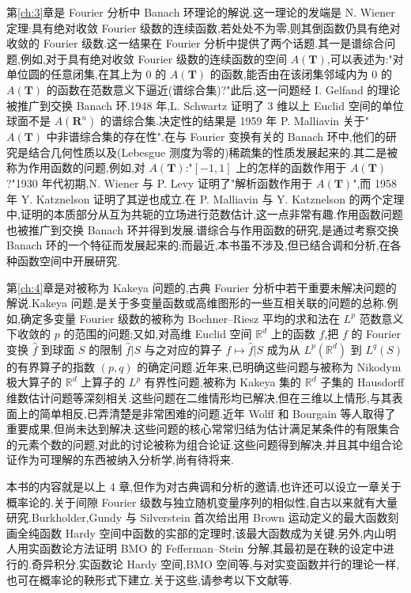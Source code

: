 第\ref{ch:3}章是 Fourier 分析中 Banach 环理论的解说.这一理论的发端是 N. Wiener 定理:具有绝对收敛 Fourier 级数的连续函数,若处处不为零,则其倒函数仍具有绝对收敛的 Fourier 级数.这一结果在 Fourier 分析中提供了两个话题.其一是谱综合问题,例如,对于具有绝对收敛 Fourier 级数的连续函数的空间 $A(\mathbf{T})$,可以表述为:"对单位圆的任意闭集,在其上为 0 的 $A(\mathbf{T})$ 的函数,能否由在该闭集邻域内为 0 的 $A(\mathbf{T})$ 的函数在范数意义下逼近(谱综合集)?"此后,这一问题经 I. Gelfand 的理论被推广到交换 Banach 环.1948 年,L. Schwartz 证明了 3 维以上 Euclid 空间的单位球面不是 $A(\mathbf{R}^{n})$ 的谱综合集.决定性的结果是 1959 年 P. Malliavin 关于"$A(\mathbf{T})$ 中非谱综合集的存在性".在与 Fourier 变换有关的 Banach 环中,他们的研究是结合几何性质以及(Lebesgue 测度为零的)稀疏集的性质发展起来的.其二是被称为作用函数的问题,例如,对 $A(\mathbf{T})$:"$[-1,1]$ 上的怎样的函数作用于 $A(\mathbf{T})$?"1930 年代初期,N. Wiener 与 P. Levy 证明了"解析函数作用于 $A(\mathbf{T})$",而 1958 年 Y. Katznelson 证明了其逆也成立.在 P. Malliavin 与 Y. Katznelson 的两个定理中,证明的本质部分从互为共轭的立场进行范数估计,这一点非常有趣.作用函数问题也被推广到交换 Banach 环并得到发展.谱综合与作用函数的研究,是通过考察交换 Banach 环的一个特征而发展起来的;而最近,本书虽不涉及,但已结合调和分析,在各种函数空间中开展研究.

第\ref{ch:4}章是对被称为 Kakeya 问题的,古典 Fourier 分析中若干重要未解决问题的解说.Kakeya 问题,是关于多变量函数或高维图形的一些互相关联的问题的总称.例如,确定多变量 Fourier 级数的被称为 Bochner--Riesz 平均的求和法在 $L^{p}$ 范数意义下收敛的 $p$ 的范围的问题;又如,对高维 Euclid 空间 $\mathbb{R}^{d}$ 上的函数 $f$,把 $f$ 的 Fourier 变换 $\hat{f}$ 到球面 $S$ 的限制 $\hat{f}|S$ 与之对应的算子 $f \mapsto \hat{f}|S$ 成为从 $L^{p}(\mathbb{R}^{d})$ 到 $L^{q}(S)$ 的有界算子的指数 $(p,q)$ 的确定问题.近年来,已明确这些问题与被称为 Nikodym 极大算子的 $\mathbb{R}^{d}$ 上算子的 $L^{p}$ 有界性问题,被称为 Kakeya 集的 $\mathbb{R}^{d}$ 子集的 Hausdorff 维数估计问题等深刻相关.这些问题在二维情形均已解决,但在三维以上情形,与其表面上的简单相反,已弄清楚是非常困难的问题.近年 Wolff 和 Bourgain 等人取得了重要成果,但尚未达到解决.这些问题的核心常常归结为估计满足某条件的有限集合的元素个数的问题,对此的讨论被称为组合论证.这些问题得到解决,并且其中组合论证作为可理解的东西被纳入分析学,尚有待将来.

本书的内容就是以上 4 章,但作为对古典调和分析的邀请,也许还可以设立一章关于概率论的.关于间隙 Fourier 级数与独立随机变量序列的相似性,自古以来就有大量研究.Burkholder,Gundy 与 Silverstein 首次给出用 Brown 运动定义的最大函数刻画全纯函数 Hardy 空间中函数的实部的定理时,该最大函数成为关键.另外,内山明人用实函数论方法证明 BMO 的 Fefferman--Stein 分解,其最初是在鞅的设定中进行的.奇异积分,实函数论 Hardy 空间,BMO 空间等,与对实变函数并行的理论一样,也可在概率论的鞅形式下建立.关于这些,请参考以下文献等.

